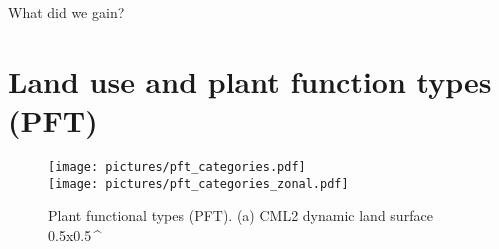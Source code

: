 \documentclass[gmd, manuscript]{copernicus}
\begin{document}



\conclusions  %
\label{sec:conc}
What did we gain?











\appendix
\section{Land use and plant function types (PFT)}    %
\appendixfigures
\begin{figure}[t]
  \centering
  \texttt{[image: pictures/pft\_categories.pdf]}\\
  \texttt{[image: pictures/pft\_categories\_zonal.pdf]}
  \caption{Plant functional types (PFT). (a) CML2 dynamic land surface 0.5x0.5\,\unit{^\circ}}
  \label{fig:pft_landsurface}
\end{figure}
\subsection{}     %



\end{document}
